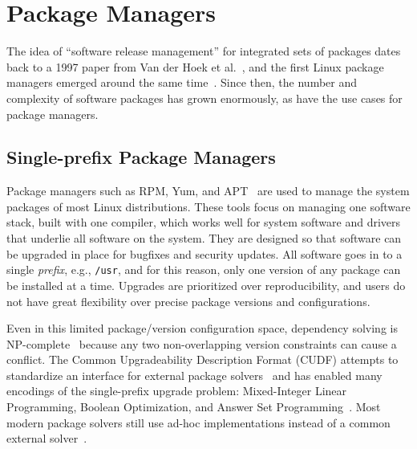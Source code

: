 \section{Package Managers}
\label{sec:package-managers}

The idea of ``software release management'' for integrated sets of packages dates back to
a 1997 paper from Van der Hoek et al.~\cite{van1997software}, and the first Linux
package managers emerged around the same time~\cite{rpm,apt}. Since then, the number and
complexity of software packages has grown enormously, as have the use cases for package
managers.

\subsection{Single-prefix Package Managers}

Package managers such as RPM, Yum, and APT~\cite{foster+:rpm03,silva:apt01,yum} are used
to manage the system packages of most Linux distributions. These tools focus on managing
one software stack, built with one compiler, which works well for system software and
drivers that underlie all software on the system. They are designed so that software can
be upgraded in place for bugfixes and security updates. All software goes in to a single
{\it prefix}, e.g., {\tt /usr}, and for this reason, only one version of any package can
be installed at a time. Upgrades are prioritized over reproducibility, and users do not
have great flexibility over precise package versions and configurations.

Even in this limited package/version configuration space, dependency solving is
NP-complete~\cite{dicosmo:edos,mancinelli+:ase06-foss-distros} because any two
non-overlapping version constraints can cause a conflict. The Common Upgradeability
Description Format (CUDF) attempts to standardize an interface for external package
solvers~\cite{abate2012dependency,abate-2013-modular-package-manager} and has enabled
many encodings of the single-prefix upgrade problem: Mixed-Integer Linear Programming,
Boolean Optimization, and Answer Set
Programming~\cite{tucker+:icse07-opium,michel+:lococo2010,argelich+:lococo2010,gebser+:2011-aspcud}.
Most modern package solvers still use ad-hoc implementations instead of a common
external solver~\cite{abate2020dependency}.

